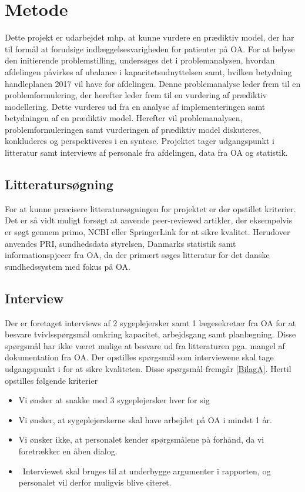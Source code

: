 

\section{Metode}
Dette projekt er udarbejdet mhp. at kunne vurdere en prædiktiv model, der har til formål at forudsige indlæggelsesvarigheden for patienter på OA. For at belyse den initierende problemstilling, undersøges det i problemanalysen, hvordan afdelingen påvirkes af ubalance i kapacitetsudnyttelsen samt, hvilken betydning handleplanen 2017 vil have for afdelingen. Denne problemanalyse leder frem til en problemformulering, der herefter leder frem til en vurdering af prædiktiv modellering. Dette vurderes ud fra en analyse af implementeringen samt betydningen af en prædiktiv model. Herefter vil problemanalysen, problemformuleringen samt vurderingen af prædiktiv model diskuteres, konkluderes og perspektiveres i en syntese. Projektet tager udgangspunkt i litteratur samt interviews af personale fra afdelingen, data fra OA og statistik. 


\subsection{Litteratursøgning}
For at kunne præcisere litteratursøgningen for projektet er der opstillet kriterier. Det er så vidt muligt forsøgt at anvende peer-reviewed artikler, der eksempelvis er søgt gennem primo, NCBI eller SpringerLink for at sikre kvalitet. Herudover anvendes PRI, sundhedsdata styrelsen, Danmarks statistik samt informationspjecer fra OA, da der primært søges litteratur for det danske sundhedssystem med fokus på OA. 


\subsection{Interview}
Der er foretaget interviews af 2 sygeplejersker samt 1 lægesekretær fra OA for at besvare tvivlsspørgsmål omkring kapacitet, arbejdsgang samt planlægning. Disse spørgsmål har ikke været mulige at besvare ud fra litteraturen pga. mangel af dokumentation fra OA. Der opstilles spørgsmål som interviewene skal tage udgangspunkt i for at sikre kvaliteten. Disse spørgsmål fremgår \ref{BilagA}. Hertil opstilles følgende kriterier 




\begin{itemize}
\item Vi ønsker at snakke med 3 sygeplejersker hver for sig
\item Vi ønsker, at sygeplejerskerne skal have arbejdet på OA i mindst 1 år.
\item Vi ønsker ikke, at personalet kender spørgsmålene på forhånd, da vi foretrækker en åben dialog.
\item\ Interviewet skal bruges til at underbygge argumenter i rapporten, og personalet vil derfor muligvis blive citeret.
\end{itemize}
